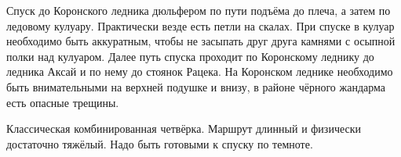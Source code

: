 Спуск до Коронского ледника дюльфером по пути подъёма до плеча, а затем по ледовому кулуару. Практически везде есть петли на скалах. При
спуске в кулуар необходимо быть аккуратным, чтобы не засыпать друг друга камнями с осыпной полки над кулуаром. Далее путь спуска проходит по
Коронскому леднику до ледника Аксай и по нему до стоянок Рацека. На Коронском леднике необходимо быть внимательными на
верхней подушке и внизу, в районе чёрного жандарма есть опасные трещины.

Классическая комбинированная четвёрка. Маршрут длинный и физически достаточно тяжёлый. Надо быть готовыми к спуску по темноте.
